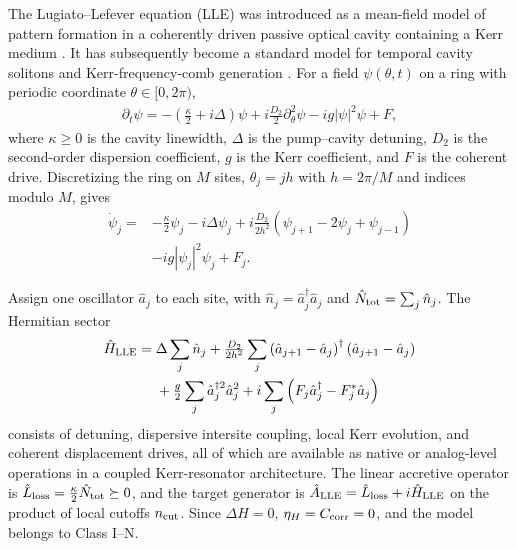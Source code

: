 \documentclass[pra,twocolumn,superscriptaddress,nofootinbib,floatfix]{revtex4-2}
\theoremstyle{remark}
\newcommand{\revcolor}{\color{blue}}
\DeclareRobustCommand{\rev}[1]{{\revcolor #1}}
\begin{document}
\rev{The Lugiato--Lefever equation (LLE) was introduced as a mean-field model of pattern formation in a coherently driven passive optical cavity containing a Kerr medium \cite{PhysRevLett.58.2209}.} \rev{It has subsequently become a standard model for temporal cavity solitons and Kerr-frequency-comb generation \cite{Coen_2013,PhysRevLett.113.123901}.} \rev{For a field $\psi(\theta,t)$ on a ring with periodic coordinate $\theta\in[0,2\pi)$,}
\begingroup\revcolor
\begin{align}
\partial_t\psi=-\left(\tfrac{\kappa}{2}+i\Delta\right)\psi+i\tfrac{D_2}{2}\partial_{\theta}^{2}\psi-ig|\psi|^2\psi+F,
\label{eq:lle-continuum}
\end{align}
\endgroup
\rev{where $\kappa\ge0$ is the cavity linewidth, $\Delta$ is the pump--cavity detuning, $D_2$ is the second-order dispersion coefficient, $g$ is the Kerr coefficient, and $F$ is the coherent drive.} \rev{Discretizing the ring on $M$ sites, $\theta_j=jh$ with $h=2\pi/M$ and indices modulo $M$, gives}
\begingroup\revcolor
\begin{align}
\dot\psi_j={}&-\tfrac{\kappa}{2}\psi_j-i\Delta\psi_j+i\tfrac{D_2}{2h^2}\left(\psi_{j+1}-2\psi_j+\psi_{j-1}\right)\nonumber\\
&-ig|\psi_j|^2\psi_j+F_j .
\label{eq:lle-discrete}
\end{align}
\endgroup

\rev{Assign one oscillator \(\hat a_j\) to each site, with $\hat n_j=\hat a_j^\dagger\hat a_j$ and $\hat N_{\rm tot}=\sum_j\hat n_j$.} The Hermitian sector
\begingroup\revcolor
\begin{align}
\hat H_{\rm LLE}={}&\Delta\sum_j\hat n_j+\tfrac{D_2}{2h^2}\sum_j\left(\hat a_{j+1}-\hat a_j\right)^\dagger\left(\hat a_{j+1}-\hat a_j\right)\nonumber\\
&+\tfrac{g}{2}\sum_j\hat a_j^{\dagger 2}\hat a_j^2+i\sum_j\left(F_j\hat a_j^\dagger-F_j^*\hat a_j\right)
\label{eq:lle-native-hamiltonian}
\end{align}
\endgroup
\rev{consists of detuning, dispersive intersite coupling, local Kerr evolution, and coherent displacement drives, all of which are available as native or analog-level operations in a coupled Kerr-resonator architecture.} \rev{The linear accretive operator is \(\hat L_{\rm loss}=\tfrac{\kappa}{2}\hat N_{\rm tot}\succeq0\), and the target generator is \(\hat A_{\rm LLE}=\hat L_{\rm loss}+i\hat H_{\rm LLE}\) on the product of local cutoffs \(n_{\rm cut}\).} \rev{Since \(\Delta H=0\), \(\eta_H=C_{\rm corr}=0\), and the model belongs to Class I--N.}
\end{document}
